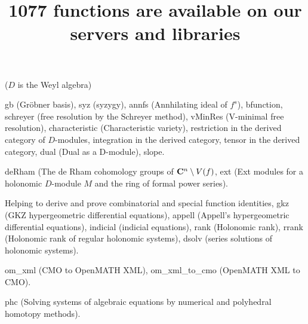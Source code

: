 \documentclass[twocolumn]{article}
\title{\huge \color{blue} 1077 functions are available
on our servers and libraries }
\author{} \date{}
\begin{document}
\maketitle

\noindent
{} ($D$ is the Weyl algebra)

\noindent
{\color{red} gb } (Gr\"obner basis),
{\color{red} syz} (syzygy),
{\color{red} annfs} (Annhilating ideal of $f^s$),
{\color{red} bfunction},
{\color{red} schreyer} (free resolution by the Schreyer method),
{\color{red} vMinRes} (V-minimal free resolution),
{\color{red} characteristic} (Characteristic variety),
{\color{red} restriction} in the derived category of $D$-modules,
{\color{red} integration} in the derived category,
{\color{red} tensor}  in the derived category,
{\color{red} dual} (Dual as a D-module),
{\color{red} slope}.

\medbreak
\noindent
{} 

\noindent
{\color{red} deRham} (The de Rham cohomology groups of
${\bf C}^n \setminus V(f)$,
{\color{red} ext} (Ext modules for a holonomic $D$-module $M$
and the ring of formal power series).

\medbreak
\noindent
{}

\noindent
Helping to derive and prove {\color{red} combinatorial} and
{\color{red} special function identities},
{\color{red} gkz} (GKZ hypergeometric differential equations),
{\color{red} appell} (Appell's hypergeometric differential equations),
{\color{red} indicial} (indicial equations),
{\color{red} rank} (Holonomic rank),
{\color{red} rrank} (Holonomic rank of regular holonomic systems),
{\color{red} dsolv} (series solutions of holonomic systems).

\medbreak
\noindent
{}

\noindent
{\color{red} om\_xml} (CMO to OpenMATH XML),
{\color{red} om\_xml\_to\_cmo} (OpenMATH XML to CMO).

\medbreak
\noindent
{}

\noindent
{\color{red} phc} (Solving systems of algebraic equations by 
numerical and polyhedral homotopy methods).

\medbreak
\noindent
{}
\end{document}
